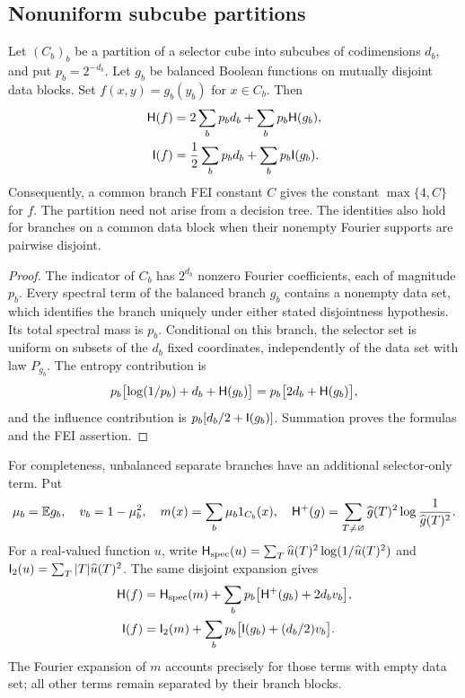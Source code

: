 \subsection{Nonuniform subcube partitions}

\begin{proposition}\label{prop:subcubemux}
Let $(C_b)_b$ be a partition of a selector cube into subcubes of codimensions $d_b$, and put $p_b=2^{-d_b}$. Let $g_b$ be balanced Boolean functions on mutually disjoint data blocks. Set $f(x,y)=g_b(y_b)$ for $x\in C_b$. Then
\begin{align}
 \mathsf H(f)&=2\sum_b p_bd_b+\sum_b p_b\mathsf H(g_b),\label{eq:subcubemuxH}\\
 \mathsf I(f)&=\frac12\sum_b p_bd_b+\sum_b p_b\mathsf I(g_b).\label{eq:subcubemuxI}
\end{align}
Consequently, a common branch FEI constant $C$ gives the constant $\max\{4,C\}$ for $f$. The partition need not arise from a decision tree. The identities also hold for branches on a common data block when their nonempty Fourier supports are pairwise disjoint.
\end{proposition}
\begin{proof}
The indicator of $C_b$ has $2^{d_b}$ nonzero Fourier coefficients, each of magnitude $p_b$. Every spectral term of the balanced branch $g_b$ contains a nonempty data set, which identifies the branch uniquely under either stated disjointness hypothesis. Its total spectral mass is $p_b$. Conditional on this branch, the selector set is uniform on subsets of the $d_b$ fixed coordinates, independently of the data set with law $P_{g_b}$. The entropy contribution is
\[
 p_b\bigl[\log(1/p_b)+d_b+\mathsf H(g_b)\bigr]
 =p_b\bigl[2d_b+\mathsf H(g_b)\bigr],
\]
and the influence contribution is $p_b[d_b/2+\mathsf I(g_b)]$. Summation proves the formulas and the FEI assertion.
\end{proof}

For completeness, unbalanced separate branches have an additional selector-only term. Put
\[
 \mu_b=\mathbb E g_b,\quad v_b=1-\mu_b^2,\quad
 m(x)=\sum_b\mu_b1_{C_b}(x),\quad
 \mathsf H^+(g)=\sum_{T\ne\varnothing}\widehat{g}(T)^2\log\frac1{\widehat{g}(T)^2}.
\]
For a real-valued function $u$, write $\mathsf H_{\rm spec}(u)=\sum_T\widehat{u}(T)^2\log(1/\widehat{u}(T)^2)$ and $\mathsf I_2(u)=\sum_T|T|\widehat{u}(T)^2$. The same disjoint expansion gives
\begin{align}
 \mathsf H(f)&=\mathsf H_{\rm spec}(m)+\sum_b p_b\bigl[\mathsf H^+(g_b)+2d_bv_b\bigr],\label{eq:unbalancedmuxH}\\
 \mathsf I(f)&=\mathsf I_2(m)+\sum_b p_b\bigl[\mathsf I(g_b)+(d_b/2)v_b\bigr].\label{eq:unbalancedmuxI}
\end{align}
The Fourier expansion of $m$ accounts precisely for those terms with empty data set; all other terms remain separated by their branch blocks.
